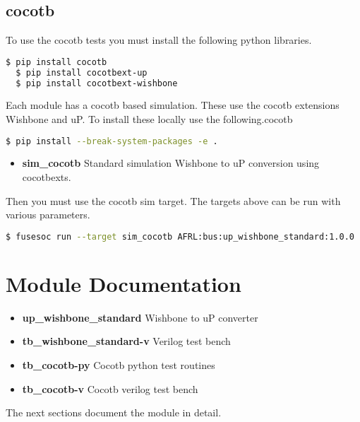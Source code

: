 \subsection{cocotb}
\par
To use the cocotb tests you must install the following python libraries.
\begin{lstlisting}[language=bash]
  $ pip install cocotb
  $ pip install cocotbext-up
  $ pip install cocotbext-wishbone
\end{lstlisting}

Each module has a cocotb based simulation. These use the cocotb extensions Wishbone and uP. To install
these locally use the following.cocotb
\begin{lstlisting}[language=bash]
  $ pip install --break-system-packages -e .
\end{lstlisting}

\begin{itemize}
  \item \textbf{sim\_cocotb} Standard simulation Wishbone to uP conversion using cocotbexts.
\end{itemize}

Then you must use the cocotb sim target. The targets above can be run with various parameters.
\begin{lstlisting}[language=bash]
  $ fusesoc run --target sim_cocotb AFRL:bus:up_wishbone_standard:1.0.0
\end{lstlisting}

\newpage

\section{Module Documentation} \label{Module Documentation}

\par

\begin{itemize}
\item \textbf{up\_wishbone\_standard} Wishbone to uP converter\\
\item \textbf{tb\_wishbone\_standard-v} Verilog test bench\\
\item \textbf{tb\_cocotb-py} Cocotb python test routines\\
\item \textbf{tb\_cocotb-v} Cocotb verilog test bench\\
\end{itemize}
The next sections document the module in detail.

